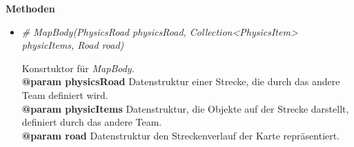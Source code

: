                 \textbf{Methoden}					
                \begin{itemize}
                    \item  \textit{\# MapBody(PhysicsRoad physicsRoad, Collection<PhysicsItem> physicItems, Road road)}
                        \begin{leftbar}[0.9\linewidth]
                            Konsrtuktor für \textit{MapBody}.\\
                            \textbf{@param physicsRoad} Datenstruktur einer Strecke, die durch das andere Team definiert wird.\\
                            \textbf{@param physicItems} Datenstruktur, die Objekte auf der Strecke darstellt, definiert durch das andere Team.\\
                            \textbf{@param road} Datenstruktur den Streckenverlauf der Karte repräsentiert.\\
                        \end{leftbar}  
                \end{itemize}
